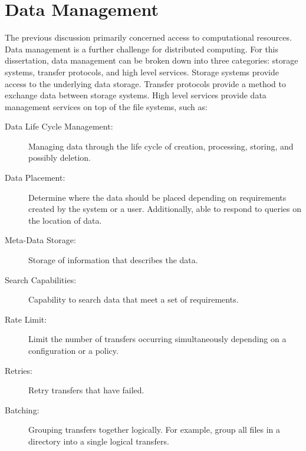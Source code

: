 




\section{Data Management}


The previous discussion primarily concerned access to computational resources.  Data management is a further challenge for distributed computing.  For this dissertation, data management can be broken down into three categories: storage systems, transfer protocols, and high level services.  Storage systems provide access to the underlying data storage.  Transfer protocols provide a method to exchange data between storage systems.  High level services provide data management services on top of the file systems, such as:

\begin{description}
	\item[Data Life Cycle Management:] Managing data through the life cycle of creation, processing, storing, and possibly deletion.
	\item[Data Placement:] Determine where the data should be placed depending on requirements created by the system or a user.  Additionally, able to respond to queries on the location of data.
	\item[Meta-Data Storage:] Storage of information that describes the data.
	\item[Search Capabilities:] Capability to search data that meet a set of requirements.
	\item[Rate Limit:] Limit the number of transfers occurring simultaneously depending on a configuration or a policy.
	\item[Retries:] Retry transfers that have failed.
	\item[Batching:] Grouping transfers together logically.  For example, group all files in a directory into a single logical transfers.
\end{description}

